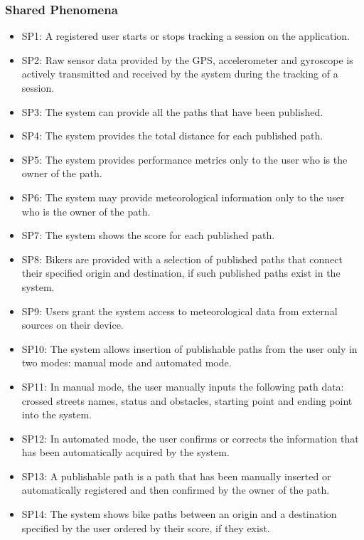 \documentclass{article}
\begin{document}
\subsubsection{Shared Phenomena}
\begin{itemize}
    \item SP1: A registered user starts or stops tracking a session on the application.
    \item SP2: Raw sensor data provided by the GPS, accelerometer and gyroscope is actively transmitted and received by the system during the tracking of a session.
    \item SP3: The system can provide all the paths that have been published.
    \item SP4: The system provides the total distance for each published path.
    \item SP5: The system provides performance metrics only to the user who is the owner of the path.
    \item SP6: The system may provide meteorological information only to the user who is the owner of the path.
    \item SP7: The system shows the score for each published path.
    \item SP8: Bikers are provided with a selection of published paths that connect their specified origin and destination, if such published paths exist in the system.
    \item SP9: Users grant the system access to meteorological data from external sources on their device.
    \item SP10: The system allows insertion of publishable paths from the user only in two modes: manual mode and automated mode.
    \item SP11: In manual mode, the user manually inputs the following path data: crossed streets names, status and obstacles, starting point and ending point into the system.
    \item SP12: In automated mode, the user confirms or corrects the information that has been automatically acquired by the system.
    \item SP13: A publishable path is a path that has been manually inserted or automatically registered and then confirmed by the owner of the path.
    \item SP14: The system shows bike paths between an origin and a destination specified by the user ordered by their score, if they exist.
\end{itemize}
\end{document}
